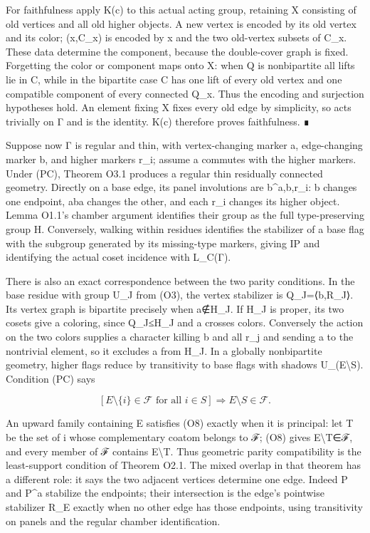 \documentclass[
  10pt,
  letterpaper,
]{article}
\begin{document}
For faithfulness apply K(c) to this actual acting group, retaining X
consisting of old vertices and all old higher objects. A new vertex is
encoded by its old vertex and its color; (x,C\_x) is encoded by x and
the two old-vertex subsets of C\_x. These data determine the component,
because the double-cover graph is fixed. Forgetting the color or
component maps onto X: when Q is nonbipartite all lifts lie in C, while
in the bipartite case C has one lift of every old vertex and one
compatible component of every connected Q\_x. Thus the encoding and
surjection hypotheses hold. An element fixing X fixes every old edge by
simplicity, so acts trivially on Γ and is the identity. K(c) therefore
proves faithfulness. ∎

Suppose now Γ is regular and thin, with vertex-changing marker a,
edge-changing marker b, and higher markers r\_i; assume a commutes with
the higher markers. Under (PC), Theorem O3.1 produces a regular thin
residually connected geometry. Directly on a base edge, its panel
involutions are b\^{}a,b,r\_i: b changes one endpoint, aba changes the
other, and each r\_i changes its higher object. Lemma O1.1's chamber
argument identifies their group as the full type-preserving group H.
Conversely, walking within residues identifies the stabilizer of a base
flag with the subgroup generated by its missing-type markers, giving IP
and identifying the actual coset incidence with L\_C(Γ).

There is also an exact correspondence between the two parity conditions.
In the base residue with group U\_J from (O3), the vertex stabilizer is
Q\_J=⟨b,R\_J⟩. Its vertex graph is bipartite precisely when a∉H\_J. If
H\_J is proper, its two cosets give a coloring, since Q\_J≤H\_J and a
crosses colors. Conversely the action on the two colors supplies a
character killing b and all r\_j and sending a to the nontrivial
element, so it excludes a from H\_J. In a globally nonbipartite
geometry, higher flags reduce by transitivity to base flags with shadows
U\_(E\textbackslash S). Condition (PC) says

\[
[E\setminus\{i\}\in\mathcal F\text{ for all }i\in S]
\Longrightarrow E\setminus S\in\mathcal F.
\tag{O8}
\]

An upward family containing E satisfies (O8) exactly when it is
principal: let T be the set of i whose complementary coatom belongs to
ℱ; (O8) gives E\textbackslash T∈ℱ, and every member of ℱ contains
E\textbackslash T. Thus geometric parity compatibility is the
least-support condition of Theorem O2.1. The mixed overlap in that
theorem has a different role: it says the two adjacent vertices
determine one edge. Indeed P and P\^{}a stabilize the endpoints; their
intersection is the edge's pointwise stabilizer R\_E exactly when no
other edge has those endpoints, using transitivity on panels and the
regular chamber identification.
\end{document}
